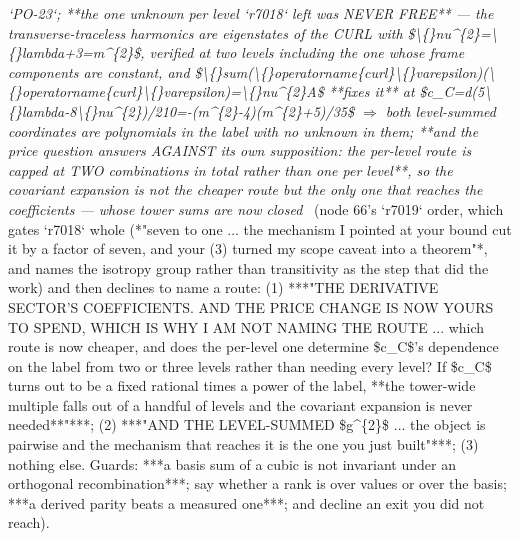 \begin{description}
\textit{`PO-23`;  **the one unknown per level `r7018` left was NEVER FREE** --- the transverse-traceless harmonics are eigenstates of the CURL with \$\textbackslash\{\}nu\textasciicircum{}\{2\}=\textbackslash\{\}lambda+3=m\textasciicircum{}\{2\}\$, verified at two levels including the one whose frame components are constant, and \$\textbackslash\{\}sum(\textbackslash\{\}operatorname\{curl\}\textbackslash\{\}varepsilon)(\textbackslash\{\}operatorname\{curl\}\textbackslash\{\}varepsilon)=\textbackslash\{\}nu\textasciicircum{}\{2\}A\$ **fixes it** at \$c\_C=d(5\textbackslash\{\}lambda-8\textbackslash\{\}nu\textasciicircum{}\{2\})/210=-(m\textasciicircum{}\{2\}-4)(m\textasciicircum{}\{2\}+5)/35\$ \ensuremath{\Rightarrow} both level-summed coordinates are polynomials in the label with no unknown in them;  **and the price question answers AGAINST its own supposition: the per-level route is capped at TWO combinations in total rather than one per level**, so the covariant expansion is not the cheaper route but the only one that reaches the coefficients --- whose tower sums are now closed} \ (node 66's `r7019` order, which gates `r7018` whole (*"seven to one ... the mechanism I pointed at your bound cut it by a factor of seven, and your (3) turned my scope caveat into a theorem"*, and names the isotropy group rather than transitivity as the step that did the work) and then declines to name a route: (1) ***"THE DERIVATIVE SECTOR'S COEFFICIENTS. AND THE PRICE CHANGE IS NOW YOURS TO SPEND, WHICH IS WHY I AM NOT NAMING THE ROUTE ... which route is now cheaper, and does the per-level one determine \$c\_C\$'s dependence on the label from two or three levels rather than needing every level? If \$c\_C\$ turns out to be a fixed rational times a power of the label, **the tower-wide multiple falls out of a handful of levels and the covariant expansion is never needed**"***; (2) ***"AND THE LEVEL-SUMMED \$g\textasciicircum{}\{2\}\$ ... the object is pairwise and the mechanism that reaches it is the one you just built"***; (3) nothing else.  Guards: ***a basis sum of a cubic is not invariant under an orthogonal recombination***; say whether a rank is over values or over the basis; ***a derived parity beats a measured one***; and decline an exit you did not reach). 

\end{description}
